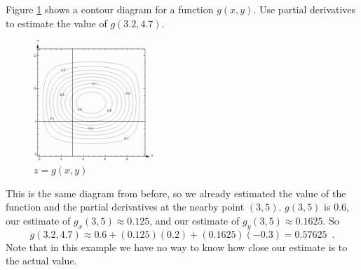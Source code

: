 \begin{example}
Figure \ref{fig:4-2-ex7} shows a contour diagram for a function $g(x,y)$. Use partial derivatives to estimate the value of $g(3.2,4.7)$.

\begin{figure}[!ht]
  \centering
    \includegraphics[width=0.4\textwidth]{img/chap4/image026.png}
    \caption{$z = g(x, y)$}
    \label{fig:4-2-ex7}
\end{figure}
\begin{solution}
  This is the same diagram from before, so we already estimated the value of the function and the partial derivatives at the nearby point $(3,5)$. $g(3,5)$ is 0.6, our estimate of $g_x(3,5)\approx   0.125$, and our estimate of $g_y(3,5)\approx   0.1625$. So
$$g(3.2,4.7)\approx   0.6+(0.125)(0.2)+(0.1625)(-0.3)=0.57625 \enspace .$$
Note that in this example we have no way to know how close our estimate is to the actual value.
\end{solution}\end{example}


